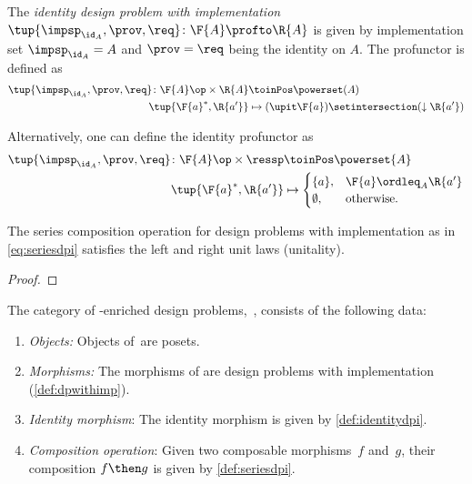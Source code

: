\begin{definition}
    \label{def:identitydpi}
    The \emph{identity design problem with implementation}~$\tup{\impsp_{\id_A},\prov,\req} \colon \F{A} \profto \R{A}$ is given by implementation set $\impsp_{\id_A} = A$ and $\prov=\req$ being the identity on $A$.
    The profunctor is defined as
    \begin{align}
        \tup{\impsp_{\id_A},\prov,\req} \colon \F{A}\op \times \R{A} & \toinPos \powerset(A) \\
        \tup{\F{a}^*,\R{a'}}                                         & \mapsto (\upit \F{a}) \setintersection (\downarrow \R{a'})
    \end{align}
\end{definition}
\begin{remark}
    Alternatively, one can define the identity profunctor as
    \begin{align}
        \tup{\impsp_{\id_A},\prov,\req}\colon \F{A}\op \times \ressp & \toinPos \powerset{A} \\
        \tup{\F{a}^*,\R{a'}}                                         & \mapsto
        \begin{cases}
            \{a\},     & \F{a}\ordleq_A \R{a'} \\
            \emptyset, & \text{otherwise}.
        \end{cases}
    \end{align}
\end{remark}

\begin{lemma}
    The series composition operation for design problems with implementation as in \cref{eq:seriesdpi} satisfies the left and right unit laws (unitality).
\end{lemma}

\begin{proof}
\end{proof}

\begin{definition}
    The category of \Set-enriched design problems,~\DPI, consists of the following data:
    \begin{enumerate}
        \item \emph{Objects:}
              Objects of~\DPI are posets.
        \item \emph{Morphisms:}
              The morphisms of \DPI are design problems with implementation (\cref{def:dpwithimp}).
        \item \emph{Identity morphism}: The identity morphism is given by \cref{def:identitydpi}.
        \item \emph{Composition operation}: Given two composable morphisms~$f$ and~$g$, their composition $f\then g$ is given by \cref{def:seriesdpi}.
    \end{enumerate}
\end{definition}

